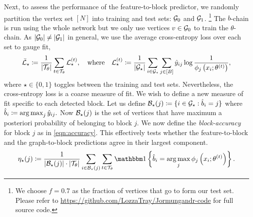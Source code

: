 Next, to assess the performance of the feature-to-block predictor, 
we randomly partition the vertex set $[N]$ into training and test sets: $\mathcal{G}_0$ and $\mathcal{G}_1$.
\footnote{We choose $f=0.7$ as the fraction of vertices that go to form our test set. Please refer to \url{https://github.com/LozzaTray/Jormungandr-code} for full source code.}
The $b$-chain is run using the whole network but we only use vertices $v \in \mathcal{G}_0$ to train the $\theta$-chain. As $|\mathcal{G}_0| \neq |\mathcal{G}_1|$ in general, we use the average cross-entropy loss 
over each set to gauge fit,
%
\begin{equation}
	\bar{\mathcal{L}}_\star \coloneqq \frac{1}{|\mathcal{T}_\theta|} \sum_{t \in \mathcal{T}_\theta} \mathcal{L}_\star^{(t)},
	\quad \textrm{where} \quad
	\mathcal{L}_\star^{(t)} \coloneqq \frac{1}{|\mathcal{G}_\star|} \sum_{i \in \mathcal{G}_\star}\sum_{j \in [B]} \hat{y}_{ij} \log \frac{1}{\phi_j \left(x_i; \theta^{(t)} \right)},
	\label{eqn:cross-entropy-loss}
\end{equation}
%
where $\star \in \{0, 1\}$ toggles between the training and test sets.
%
Nevertheless, the cross-entropy loss is a coarse measure of fit. We wish to define a new measure of fit specific to each detected block. Let us define
$
	\mathcal{B}_\star(j) \coloneqq \{i \in \mathcal{G}_\star : \hat{b}_i = j\}
$
where
$ 
	\hat{b}_i \coloneqq \operatorname*{arg\,max}_j \hat{y}_{ij}.
$
Now $\mathcal{B}_\star(j)$ is the set of vertices that have maximum a posteriori probability of belonging to block $j$. We now define the {\em block-accuracy} for block $j$ as in \ref{eqn:accuracy}. This effectively tests whether the feature-to-block and the graph-to-block predictions agree in their largest component.
%
\begin{equation}
	\eta_\star(j) \coloneqq \frac{1}{|\Bcal_\star (j)| \cdot 
	|\Tcal_\theta| } 
	\sum_{i \in \Bcal_\star (j)}  \sum_{t \in \Tcal_\theta}
	\one \left\{\hat{b}_i = \argmax_j \phi_j \left( x_i; \theta^{(t)} \right) \right\}.
	\label{eqn:accuracy}
\end{equation}




